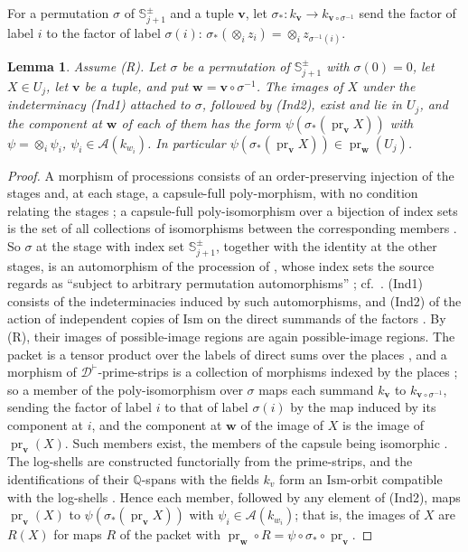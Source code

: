 \documentclass[11pt]{amsart}
\newtheorem{lemma}[theorem]{Lemma}
\theoremstyle{remark}
\newcommand{\Q}{\mathbb Q}
\newcommand{\cA}{\mathcal A}
\newcommand{\pr}{\operatorname{pr}}
\newcommand{\Sj}{\mathbb S^{\pm}_{j+1}}
\newcommand{\bv}{\mathbf v}
\newcommand{\bw}{\mathbf w}
\begin{document}
For a permutation $\sigma$ of $\Sj$ and a tuple $\bv$, let $\sigma_*\colon k_{\bv}\to k_{\bv\circ\sigma^{-1}}$ send the
factor of label $i$ to the factor of label $\sigma(i)$: $\sigma_*(\otimes_i z_i)=\otimes_i z_{\sigma^{-1}(i)}$.

\begin{lemma}\label{l:transport}
Assume \textup{(R)}. Let $\sigma$ be a permutation of $\Sj$ with $\sigma(0)=0$, let $X\in U_j$, let $\bv$ be a tuple, and put
$\bw=\bv\circ\sigma^{-1}$. The images of $X$ under the indeterminacy (Ind1) attached to $\sigma$, followed by (Ind2),
exist and lie in $U_j$, and the component at $\bw$ of each of them has the form $\psi(\sigma_*(\pr_{\bv}X))$ with
$\psi=\otimes_i\psi_i$, $\psi_i\in\cA(k_{w_i})$. In particular $\psi(\sigma_*(\pr_{\bv}X))\in\pr_{\bw}(U_j)$.
\end{lemma}

\begin{proof}
A morphism of processions consists of an order-preserving injection of the stages and, at each stage, a
capsule-full poly-morphism, with no condition relating the stages \cite[Def.~4.10, p.~120]{IUT1}; a capsule-full
poly-isomorphism over a bijection of index sets is the set of all collections of isomorphisms between the
corresponding members \cite[\S0, p.~34]{IUT1}. So $\sigma$ at the stage with index set $\Sj$, together with the
identity at the other stages, is an automorphism of the procession of \cite[Thm.~3.11(i)]{IUT3}, whose index sets
the source regards as ``subject to arbitrary permutation automorphisms'' \cite[p.~10]{IUT3}; cf.\
\cite[Prop.~6.9(i), p.~169]{IUT1}. (Ind1) consists of the indeterminacies induced by such automorphisms, and
(Ind2) of the action of independent copies of $\mathrm{Ism}$ on the direct summands of the factors
\cite[Thm.~3.11(i), p.~154]{IUT3}. By \textup{(R)}, their images of possible-image regions are again possible-image regions. The packet is a
tensor product over the labels of direct sums over the places \cite[Prop.~3.2]{IUT3}, and a morphism of
$\mathcal D^{\vdash}$-prime-strips is a collection of morphisms indexed by the places \cite[Def.~4.1(iv),
p.~96]{IUT1}; so a member of the poly-isomorphism over $\sigma$ maps each summand $k_{\bv}$ to
$k_{\bv\circ\sigma^{-1}}$, sending the factor of label $i$ to that of label $\sigma(i)$ by the map induced by its
component at $i$, and the component at $\bw$ of the image of $X$ is the image of $\pr_{\bv}(X)$. Such members exist,
the members of the capsule being isomorphic \cite[Def.~4.1(iii)]{IUT1}. The log-shells are constructed functorially
from the prime-strips, and the identifications of their $\Q$-spans with the fields $k_v$ form an $\mathrm{Ism}$-orbit
compatible with the log-shells \cite[Prop.~1.2(vi), p.~32]{IUT3}. Hence each member, followed by any element of
(Ind2), maps $\pr_{\bv}(X)$ to $\psi(\sigma_*(\pr_{\bv}X))$ with $\psi_i\in\cA(k_{w_i})$; that is, the images of $X$
are $R(X)$ for maps $R$ of the packet with $\pr_{\bw}\circ R=\psi\circ\sigma_*\circ\pr_{\bv}$.
\end{proof}
\end{document}
